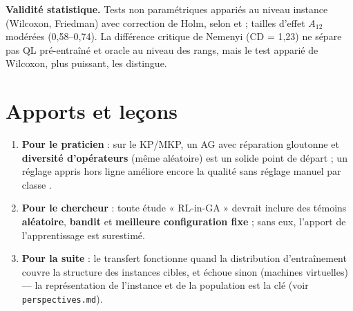 \documentclass[
  french,
  11pt,
  a4paper,
]{article}
\providecommand{\tightlist}{%
  \setlength{\itemsep}{0pt}\setlength{\parskip}{0pt}}
\begin{document}
\textbf{Validité statistique.} Tests non paramétriques appariés au
niveau instance (Wilcoxon, Friedman) avec correction de Holm, selon
\textcite{demsar_2006} et \textcite{derrac_2011} ; tailles d'effet
\(A_{12}\) \autocite{vargha_delaney_2000} modérées (0,58--0,74). La
différence critique de Nemenyi (CD = 1,23) ne sépare pas QL pré-entraîné
et oracle au niveau des rangs, mais le test apparié de Wilcoxon, plus
puissant, les distingue.

\section{Apports et leçons}\label{discussion-apports-et-leuxe7ons}

\begin{enumerate}
\def\labelenumi{\arabic{enumi}.}
\tightlist
\item
  \textbf{Pour le praticien} : sur le KP/MKP, un AG avec réparation
  gloutonne et \textbf{diversité d'opérateurs} (même aléatoire) est un
  solide point de départ ; un réglage appris hors ligne améliore encore
  la qualité sans réglage manuel par classe
  \autocite{eiben_1999,biedenkapp_2020}.
\item
  \textbf{Pour le chercheur} : toute étude « RL-in-GA » devrait inclure
  des témoins \textbf{aléatoire}, \textbf{bandit} et \textbf{meilleure
  configuration fixe} ; sans eux, l'apport de l'apprentissage est
  surestimé.
\item
  \textbf{Pour la suite} : le transfert fonctionne quand la distribution
  d'entraînement couvre la structure des instances cibles, et échoue
  sinon (machines virtuelles) --- la représentation de l'instance et de
  la population est la clé (voir \texttt{perspectives.md}).
\end{enumerate}

\printbibliography[title=Bibliographie]
\end{document}
